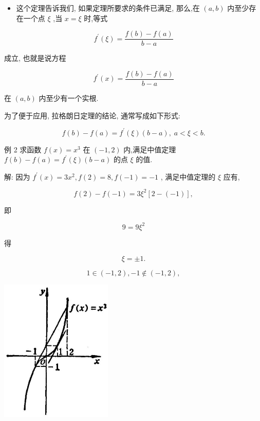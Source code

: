 \documentclass[lang=cn,newtx,12pt,scheme=chinese]{elegantbook}
\begin{document}
\begin{itemize}
\item 这个定理告诉我们, 如果定理所要求的条件已满足, 那么,在 \(\left( {a,b}\right)\) 内至少存在一个点 \(\xi\) ,当 \(x = \xi\) 时,等式
\end{itemize}

\[
{f}^{\prime }\left( \xi \right) = \frac{f\left( b\right) - f\left( a\right) }{b - a}
\]

成立, 也就是说方程

\[
{f}^{\prime }\left( x\right) = \frac{f\left( b\right) - f\left( a\right) }{b - a}
\]

在 \(\left( {a,b}\right)\) 内至少有一个实根.

为了便于应用, 拉格朗日定理的结论, 通常写成如下形式:

\[
f\left( b\right) - f\left( a\right) = {f}^{\prime }\left( \xi \right) \left( {b - a}\right) ,\;a < \xi < b.
\]

例 2 求函数 \(f\left( x\right) = {x}^{3}\) 在 \(\left( {-1,2}\right)\) 内,满足中值定理 \(f\left( b\right) - f\left( a\right) = {f}^{\prime }\left( \xi \right) \left( {b - a}\right)\) 的点 \(\xi\) 的值.

解: 因为 \({f}^{\prime }\left( x\right) = 3{x}^{2},f\left( 2\right) = 8,f\left( {-1}\right) = - 1\) , 满足中值定理的 \(\xi\) 应有,

\[
f\left( 2\right) - f\left( {-1}\right) = 3{\xi }^{2}\left\lbrack {2 - \left( {-1}\right) }\right\rbrack ,
\]

即

\[
9 = 9{\xi }^{2}
\]

得

\[
\xi = \pm 1\text{.}
\]

\[
1 \in \left( {-1,2}\right) , - 1 \notin \left( {-1,2}\right) ,
\]

\begin{center}
\includegraphics[max width=0.4\textwidth]{images/01912c18-5c3f-733d-b775-749ba9897a9d_135_695444.jpg}
\end{center}
\end{document}
